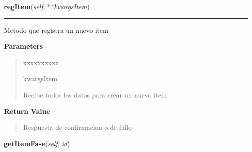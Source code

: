 \hspace{.8\funcindent}\begin{boxedminipage}{\funcwidth}

    \raggedright \textbf{regItem}(\textit{self}, **\textit{kwargsItem})

    \vspace{-1.5ex}

    \rule{\textwidth}{0.5\fboxrule}
\setlength{\parskip}{2ex}
    Metodo que registra un nuevo item

\setlength{\parskip}{1ex}
      \textbf{Parameters}
      \vspace{-1ex}

      \begin{quote}
        \begin{Ventry}{xxxxxxxxxx}

          \item[kwargsItem]

          Recibe todos los datos para crear un nuevo item

        \end{Ventry}

      \end{quote}

      \textbf{Return Value}
    \vspace{-1ex}

      \begin{quote}
      Respuesta de confirmacion o de fallo

      \end{quote}

    \end{boxedminipage}

    \label{app:controlador:contItem:ControllerItem:getItemFase}

    \vspace{0.5ex}

\hspace{.8\funcindent}\begin{boxedminipage}{\funcwidth}

    \raggedright \textbf{getItemFase}(\textit{self}, \textit{id})

\setlength{\parskip}{2ex}
\setlength{\parskip}{1ex}
    \end{boxedminipage}

